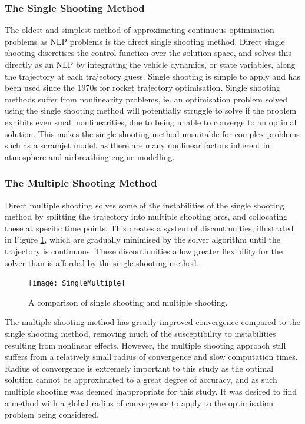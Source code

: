 \subsubsection{The Single Shooting Method}

The oldest and simplest method of approximating continuous optimisation problems as NLP problems is the direct single shooting method. Direct single shooting discretises the control function over the solution space, and solves this directly as an NLP by integrating the vehicle dynamics, or state variables, along the trajectory at each trajectory guess\cite{Betts1998,Kelly2015,Rao2009,Fasano2013}. Single shooting is simple to apply and has been used since the 1970s for rocket trajectory optimisation\cite{jezewski1971}. Single shooting methods suffer from nonlinearity problems, ie. an optimisation problem solved using the single shooting method will potentially struggle to solve if the problem exhibits even small nonlinearities, due to being unable to converge to an optimal solution. This makes the single shooting method unsuitable for complex problems such as a scramjet model, as there are many nonlinear factors inherent in atmosphere and airbreathing engine modelling.


\subsubsection{The Multiple Shooting Method}

Direct multiple shooting solves some of the instabilities of the single shooting method by splitting the trajectory into multiple shooting arcs, and collocating these at specific time points\cite{Betts1998,Kelly2015,Rao2009,Fasano2013}. This creates a system of discontinuities, illustrated in Figure \ref{fig:multipleshooting}, which are gradually minimised by the solver algorithm until the trajectory is continuous. These discontinuities allow greater flexibility for the solver than is afforded by the single shooting method. 

\begin{figure}[ht]
	\centering
	\texttt{[image: SingleMultiple]}
	\caption{A comparison of single shooting and multiple shooting\cite{Kelly2015}.}
	\label{fig:multipleshooting}
\end{figure}

The multiple shooting method has greatly improved convergence compared to the single shooting method, removing much of the susceptibility to instabilities resulting from nonlinear effects. However, the multiple shooting approach still suffers from a relatively small radius of convergence and slow computation times\cite{Fasano2013}. Radius of convergence is extremely important to this study as the optimal solution cannot be approximated to a great degree of accuracy, and as such multiple shooting was deemed inappropriate for this study. It was desired to find a method with a global radius of convergence to apply to the optimisation problem being considered.


